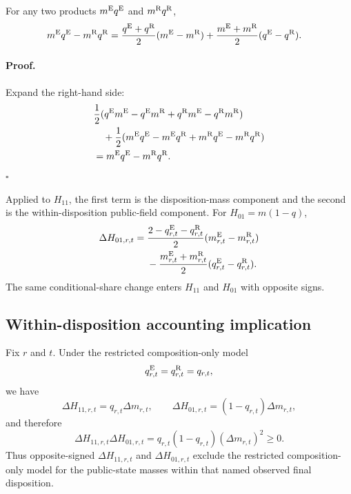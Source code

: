 \documentclass[11pt]{article}
\begin{document}
For any two products $m^{\mathrm{E}} q^{\mathrm{E}}$ and $m^{\mathrm{R}} q^{\mathrm{R}}$,
\begin{align}
m^{\mathrm{E}} q^{\mathrm{E}}-m^{\mathrm{R}} q^{\mathrm{R}}
={}&\frac{q^{\mathrm{E}}+q^{\mathrm{R}}}{2}(m^{\mathrm{E}}-m^{\mathrm{R}})
+\frac{m^{\mathrm{E}}+m^{\mathrm{R}}}{2}(q^{\mathrm{E}}-q^{\mathrm{R}}).
\label{eq:kitagawa_cell}
\end{align}

\paragraph{Proof.}
Expand the right-hand side:
\begin{align*}
&\frac{1}{2}(q^{\mathrm{E}} m^{\mathrm{E}}-q^{\mathrm{E}} m^{\mathrm{R}}+q^{\mathrm{R}} m^{\mathrm{E}}-q^{\mathrm{R}} m^{\mathrm{R}})\\
&\quad+\frac{1}{2}(m^{\mathrm{E}} q^{\mathrm{E}}-m^{\mathrm{E}} q^{\mathrm{R}}+m^{\mathrm{R}} q^{\mathrm{E}}-m^{\mathrm{R}} q^{\mathrm{R}})\\
&=m^{\mathrm{E}} q^{\mathrm{E}}-m^{\mathrm{R}} q^{\mathrm{R}}.
\end{align*}
$\square$

Applied to $H_{11}$, the first term is the disposition-mass component and the second is the within-disposition public-field component. For $H_{01}=m(1-q)$,
\begin{align}
\Delta H_{01,r,t}
={}&\frac{2-q^{\mathrm{E}}_{r,t}-q^{\mathrm{R}}_{r,t}}{2}
(m^{\mathrm{E}}_{r,t}-m^{\mathrm{R}}_{r,t})\notag\\
&-\frac{m^{\mathrm{E}}_{r,t}+m^{\mathrm{R}}_{r,t}}{2}
(q^{\mathrm{E}}_{r,t}-q^{\mathrm{R}}_{r,t}).
\label{eq:kitagawa01}
\end{align}
The same conditional-share change enters $H_{11}$ and $H_{01}$ with opposite signs.

\subsection{Within-disposition accounting implication}

\begin{plainbox}[title=Remark: sign implication under a restricted accounting model]
Fix $r$ and $t$. Under the restricted composition-only model
\begin{equation}
q^{\mathrm{E}}_{r,t}=q^{\mathrm{R}}_{r,t}=q_{r,t},
\end{equation}
we have
\begin{equation}
\Delta H_{11,r,t}=q_{r,t}\Delta m_{r,t},
\qquad
\Delta H_{01,r,t}=(1-q_{r,t})\Delta m_{r,t},
\end{equation}
and therefore
\begin{equation}
\Delta H_{11,r,t}\Delta H_{01,r,t}
=q_{r,t}(1-q_{r,t})(\Delta m_{r,t})^2\ge0.
\label{eq:signrestriction}
\end{equation}
Thus opposite-signed $\Delta H_{11,r,t}$ and $\Delta H_{01,r,t}$ exclude the restricted composition-only model for the public-state masses within that named observed final disposition.
\end{plainbox}
\end{document}
